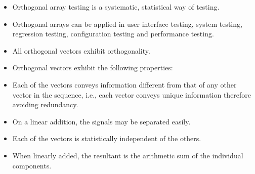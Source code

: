 \begin{itemize}
\item Orthogonal array testing is a systematic, statistical way of testing. 
\item Orthogonal arrays can be applied in user interface testing, system testing, regression testing, configuration testing and performance testing.
\item All orthogonal vectors exhibit orthogonality. 
\item Orthogonal vectors exhibit the following properties:
\item Each of the vectors conveys information different from that of any other vector in the sequence, i.e., each vector conveys unique information therefore avoiding redundancy.
\item On a linear addition, the signals may be separated easily.
\item Each of the vectors is statistically independent of the others.
\item When linearly added, the resultant is the arithmetic sum of the individual components.
\end{itemize}

%
%
%
